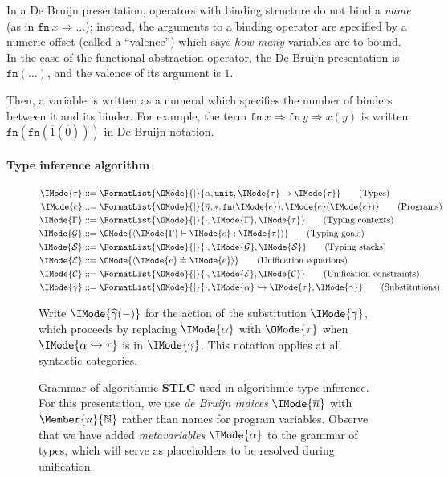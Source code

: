 \documentclass[twocolumn,9pt]{article}
\theoremstyle{definition}
\theoremstyle{remark}
\numberwithin{equation}{section}
\newcommand\Nat{\mathbb{N}}
\newcommand\STLC{{\sffamily\bfseries{}STLC}}
\newcommand\Nil{*}
\newcommand\Fn[2]{\mathtt{fn}\ {#1}\Rightarrow{#2}}
\newcommand\DBFn[1]{\mathtt{fn} (#1)}
\newcommand\TyUnit{\mathtt{unit}}
\newcommand\TyArr[2]{#1\to{#2}}
\newcommand\Var[1]{\overline{#1}}
\newcommand\MkGoal[3]{\langle{#1}\vdash{#2}:{#3}\rangle}
\newcommand\MkEq[2]{\langle{#1}\doteq{#2}\rangle}
\newcommand\Subst[2]{\widehat{#1} (#2)}
\begin{document}
In a De Bruijn presentation, operators with binding structure do not
bind a \emph{name} (as in $\Fn{x}{\ldots}$); instead, the arguments to
a binding operator are specified by a numeric offset (called a
``valence'') which says \emph{how many} variables are to bound. In the
case of the functional abstraction operator, the De Bruijn
presentation is $\DBFn{\ldots}$, and the valence of its argument is
$1$.

Then, a variable is written as a numeral which specifies the number of
binders between it and its binder. For example, the term
$\Fn{x}{\Fn{y}{x(y)}}$ is written
$\DBFn{\DBFn{\overline{1}(\overline{0})}}$ in De Bruijn notation.

\paragraph{Type inference algorithm}



\begin{figure*}
  \begin{align*}
    \IMode{\tau} &::= \FormatList{\OMode}{\mid}{\alpha, \TyUnit,\TyArr{\IMode{\tau}}{\IMode{\tau}}}
    \tag{Types}
    \\
    \IMode{e} &::= \FormatList{\OMode}{\mid}{\Var{n}, \Nil, \DBFn{\IMode{e}}, \IMode{e}(\IMode{e})}
    \tag{Programs}
    \\
    \IMode{\Gamma} &::= \FormatList{\OMode}{\mid}{\cdot,{\IMode{\Gamma},\IMode{\tau}}}
    \tag{Typing contexts}
    \\
    \IMode{\mathcal{G}} &::= \OMode{\MkGoal{\IMode{\Gamma}}{\IMode{e}}{\IMode{\tau}}}
    \tag{Typing goals}
    \\
    \IMode{\mathcal{S}} &::= \FormatList{\OMode}{\mid}{\cdot, {\IMode{\mathcal{G}},\IMode{\mathcal{S}}}}
    \tag{Typing stacks}
    \\
    \IMode{\mathcal{E}} &::= \OMode{\MkEq{\IMode{e}}{\IMode{e}}}
    \tag{Unification equations}
    \\
    \IMode{\mathcal{C}} &::= \FormatList{\OMode}{\mid}{\cdot,{\IMode{\mathcal{E}},\IMode{\mathcal{C}}}}
    \tag{Unification constraints}
    \\
    \IMode{\gamma} &::= \FormatList{\OMode}{\mid}{\cdot, {\IMode{\alpha}\hookrightarrow\IMode{\tau},\IMode{\gamma}}}
    \tag{Substitutions}
  \end{align*}

  Write $\IMode{\Subst{\gamma}{-}}$ for the action of the substitution
  $\IMode{\gamma}$, which proceeds by replacing $\IMode{\alpha}$ with
  $\OMode{\tau}$ when $\IMode{\alpha\hookrightarrow\tau}$ is in
  $\IMode{\gamma}$. This notation applies at all syntactic categories.

  \caption{Grammar of algorithmic \STLC{} used in algorithmic type
    inference.  For this presentation, we use \emph{de Bruijn indices}
    $\IMode{\Var{n}}$ with $\Member{n}{\Nat}$ rather than names for
    program variables. Observe that we have added \emph{metavariables}
    $\IMode{\alpha}$ to the grammar of types, which will serve as
    placeholders to be resolved during unification.
  }\label{fig:stlc-algorithmic-grammar}
\end{figure*}
\end{document}

